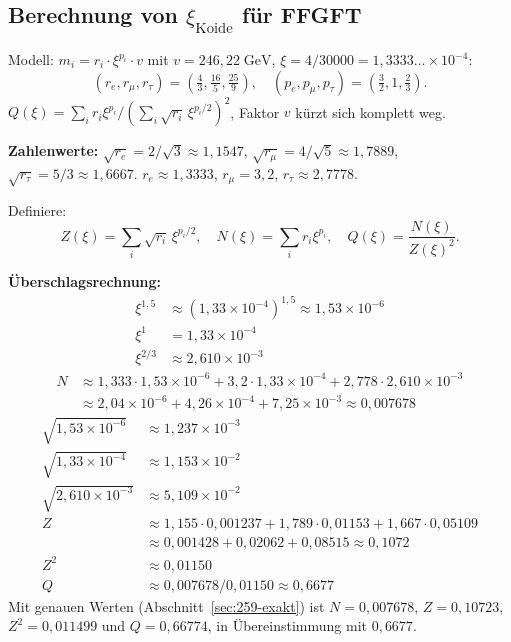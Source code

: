 \subsection{Berechnung von $\xi_{\text{Koide}}$ für FFGFT}

Modell: $m_i=r_i\cdot\xi^{p_i}\cdot v$ mit $v=246{,}22\;\text{GeV}$,
$\xi=4/30000=1{,}3333\ldots\times10^{-4}$:
\[
  (r_e,r_\mu,r_\tau)=\left(\tfrac{4}{3},\tfrac{16}{5},\tfrac{25}{9}\right),
  \quad (p_e,p_\mu,p_\tau)=\left(\tfrac{3}{2},1,\tfrac{2}{3}\right).
\]
$Q(\xi)=\sum_ir_i\xi^{p_i}/(\sum_i\sqrt{r_i}\,\xi^{p_i/2})^2$,
Faktor $v$ kürzt sich komplett weg.

\textbf{Zahlenwerte:}
$\sqrt{r_e}=2/\sqrt{3}\approx1{,}1547$, $\sqrt{r_\mu}=4/\sqrt{5}\approx1{,}7889$,
$\sqrt{r_\tau}=5/3\approx1{,}6667$.
$r_e\approx1{,}3333$, $r_\mu=3{,}2$, $r_\tau\approx2{,}7778$.

Definiere:
\[
  Z(\xi)=\sum_i\sqrt{r_i}\,\xi^{p_i/2}, \quad
  N(\xi)=\sum_ir_i\xi^{p_i}, \quad
  Q(\xi)=\frac{N(\xi)}{Z(\xi)^2}.
\]

\textbf{Überschlagsrechnung:}
\begin{align*}
  \xi^{1{,}5} &\approx (1{,}33\times10^{-4})^{1{,}5}
    \approx 1{,}53\times10^{-6} \\
  \xi^1 &= 1{,}33\times10^{-4} \\
  \xi^{2/3} &\approx 2{,}610\times10^{-3}
\end{align*}
\begin{align*}
  N &\approx 1{,}333\cdot1{,}53\times10^{-6}+3{,}2\cdot1{,}33\times10^{-4}
    +2{,}778\cdot2{,}610\times10^{-3} \\
    &\approx 2{,}04\times10^{-6}+4{,}26\times10^{-4}+7{,}25\times10^{-3}
    \approx 0{,}007678
\end{align*}
\begin{align*}
  \sqrt{1{,}53\times10^{-6}} &\approx 1{,}237\times10^{-3} \\
  \sqrt{1{,}33\times10^{-4}} &\approx 1{,}153\times10^{-2} \\
  \sqrt{2{,}610\times10^{-3}} &\approx 5{,}109\times10^{-2} \\
  Z &\approx 1{,}155\cdot0{,}001237+1{,}789\cdot0{,}01153+1{,}667\cdot0{,}05109 \\
    &\approx 0{,}001428+0{,}02062+0{,}08515\approx0{,}1072 \\
  Z^2 &\approx 0{,}01150 \\
  Q &\approx 0{,}007678/0{,}01150\approx0{,}6677
\end{align*}
Mit genauen Werten (Abschnitt~\ref{sec:259-exakt}) ist $N=0{,}007678$,
$Z=0{,}10723$, $Z^2=0{,}011499$ und $Q=0{,}66774$, in Übereinstimmung
mit $0{,}6677$.

